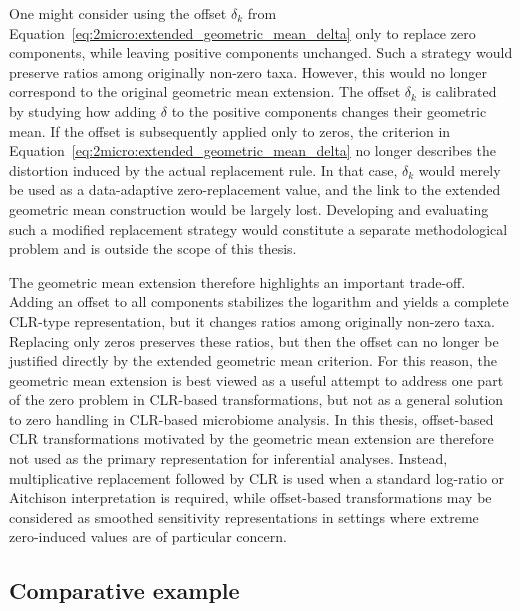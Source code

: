 One might consider using the offset $\delta_k$ from Equation~\eqref{eq:2micro:extended_geometric_mean_delta} only to replace zero components, while leaving positive components unchanged. Such a strategy would preserve ratios among originally non-zero taxa. However, this would no longer correspond to the original geometric mean extension. The offset $\delta_k$ is calibrated by studying how adding $\delta$ to the positive components changes their geometric mean. If the offset is subsequently applied only to zeros, the criterion in Equation~\eqref{eq:2micro:extended_geometric_mean_delta} no longer describes the distortion induced by the actual replacement rule. In that case, $\delta_k$ would merely be used as a data-adaptive zero-replacement value, and the link to the extended geometric mean construction would be largely lost. Developing and evaluating such a modified replacement strategy would constitute a separate methodological problem and is outside the scope of this thesis.

The geometric mean extension therefore highlights an important trade-off. Adding an offset to all components stabilizes the logarithm and yields a complete CLR-type representation, but it changes ratios among originally non-zero taxa. Replacing only zeros preserves these ratios, but then the offset can no longer be justified directly by the extended geometric mean criterion. For this reason, the geometric mean extension is best viewed as a useful attempt to address one part of the zero problem in CLR-based transformations, but not as a general solution to zero handling in CLR-based microbiome analysis. In this thesis, offset-based CLR transformations motivated by the geometric mean extension are therefore not used as the primary representation for inferential analyses. Instead, multiplicative replacement followed by CLR is used when a standard log-ratio or Aitchison interpretation is required, while offset-based transformations may be considered as smoothed sensitivity representations in settings where extreme zero-induced values are of particular concern.

\subsection{Comparative example}
\label{sec:2micro:clr_with_zeros:example}

